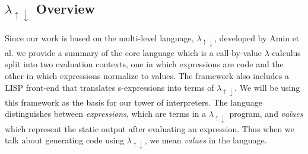 \documentclass[a4paper,12pt,twoside,openright]{report}
\theoremstyle{definition}
\newcommand{\mslang}{$\lambda_{\uparrow\downarrow}$}
\begin{document}
%

\subsection{\texorpdfstring{\mslang}{Lg} Overview}\label{subsec:mslang}

Since our work is based on the multi-level language, \mslang, developed by Amin et al. \cite{amin2017collapsing} we provide a summary of the core language which is a call-by-value $\lambda$-calculus split into two evaluation contexts, one in which expressions are code and the other in which expressions normalize to values. The framework also includes a LISP front-end that translates s-expressions into terms of \mslang. We will be using this framework as the basis for our tower of interpreters. The language distinguishes between \textit{expressions}, which are terms in a \mslang{} program, and \textit{values} which represent the static output after evaluating an expression. Thus when we talk about generating code using \mslang{}, we mean \textit{values} in the language.
\end{document}
